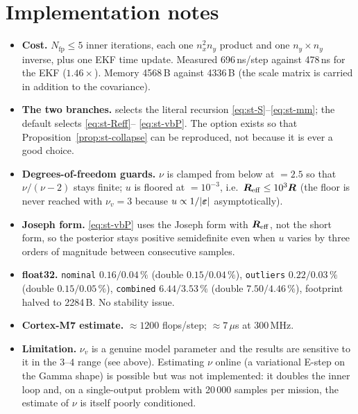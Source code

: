 \section{Implementation notes}
\begin{itemize}[nosep]
\item \textbf{Cost.}  $N_{\mathrm{fp}}\le5$ inner iterations, each one $n_x^2n_y$ product and one
$n_y\times n_y$ inverse, plus one EKF time update.  Measured 696\,ns/step against 478\,ns for the
EKF ($1.46\times$).  Memory 4568\,B against 4336\,B (the scale matrix is carried in addition to the
covariance).
\item \textbf{The two branches.}   selects the literal recursion
\eqref{eq:st-S}--\eqref{eq:st-mm}; the default  selects \eqref{eq:st-Reff}--%
\eqref{eq:st-vbP}.  The option exists so that Proposition~\ref{prop:st-collapse} can be
reproduced, not because it is ever a good choice.
\item \textbf{Degrees-of-freedom guards.}  $\nu$ is clamped from below at
$=2.5$ so that $\nu/(\nu-2)$ stays finite; $u$ is floored at
$=10^{-3}$, i.e.\ $\bm{R}_{\mathrm{eff}}\le10^{3}\bm{R}$ (the floor is never reached with
$\nu_v=3$ because $u\propto1/|\bm{\varepsilon}|$ asymptotically).
\item \textbf{Joseph form.}  \eqref{eq:st-vbP} uses the Joseph form with $\bm{R}_{\mathrm{eff}}$, not
the short form, so the posterior stays positive semidefinite even when $u$ varies by three orders
of magnitude between consecutive samples.
\item \textbf{float32.}  \texttt{nominal} $0.16/0.04\,\%$ (double $0.15/0.04\,\%$),
\texttt{outliers} $0.22/0.03\,\%$ (double $0.15/0.05\,\%$), \texttt{combined} $6.44/3.53\,\%$
(double $7.50/4.46\,\%$), footprint halved to 2284\,B.  No stability issue.
\item \textbf{Cortex-M7 estimate.}  $\approx1200$ flops/step; $\approx7\,\mu$s at 300\,MHz.
\item \textbf{Limitation.}  $\nu_v$ is a genuine model parameter and the results are sensitive to
it in the $3$--$4$ range (see above).  Estimating $\nu$ online (a variational E-step on the Gamma
shape) is possible but was not implemented: it doubles the inner loop and, on a single-output
problem with 20\,000 samples per mission, the estimate of $\nu$ is itself poorly conditioned.
\end{itemize}

